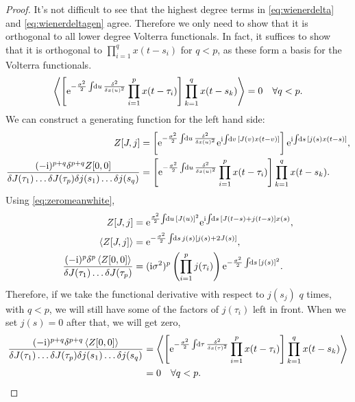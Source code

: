 \documentclass[12pt]{article}
\theoremstyle{slplain}
\theoremstyle{sldefinition}
\theoremstyle{remark}
\begin{document}
\begin{proof}
  It's not difficult to see that the highest degree terms in \eqref{eq:wienerdelta} and \eqref{eq:wienerdeltagen} agree. Therefore we only need to show that it is orthogonal to all lower degree Volterra functionals. In fact, it suffices to show that it is orthogonal to $\prod_{i=1}^q x(t-s_i)$ for $q<p$, as these form a basis for the Volterra functionals.
  \begin{equation}\label{eq:wienerdeltavol}
    \av{\brk{\e^{-\frac{\sigma^2}{2}\intd{u}\fdf{^2}{x(u)^2}} \prod_{i=1}^p x(t-\tau_i)}\prod_{k=1}^q x(t-s_k)} = 0 \quad \forall q<p.
  \end{equation}
  We can construct a generating function for the left hand side:
  \begin{equation}\label{eq:wienerdeltavolgen}
    \begin{aligned}
      Z[J,j] &= \brk{\e^{-\frac{\sigma^2}{2}\intd{u}\fdf{^2}{x(u)^2}} \e^{\ir\!\intd{v} [J(v) x(t-v)]}} \e^{\ir\!\intd{s} [j(s) x(t-s)]},\\
      \frac{(-\ir)^{p+q}\delta^{p+q}Z[0,0]}{\delta J(\tau_1)\ldots\delta J(\tau_p) \delta j(s_1)\ldots\delta j(s_q)}  &= \brk{\e^{-\frac{\sigma^2}{2}\intd{u}\fdf{^2}{x(u)^2}} \prod_{i=1}^p x(t-\tau_i)}\prod_{k=1}^q x(t-s_k).
    \end{aligned}
  \end{equation}
  Using \eqref{eq:zeromeanwhite},
  \begin{equation*}
    \begin{aligned}
      Z[J,j] &= \e^{\frac{\sigma^2}{2}\!\intd{u} [J(u)]^2} \e^{\ir\!\intd{s} [J(t-s)+j(t-s)] x(s)}, \\
       \av{Z[J,j]} &= \e^{-\frac{\sigma^2}{2}\intd{s} j(s)[j(s)+2J(s)]},\\
       \frac{(-\ir)^{p}\delta^{p}\av{Z[0,0]}}{\delta J(\tau_1)\ldots\delta J(\tau_p)}  &= (\ir\sigma^2)^p \prn{\prod_{i=1}^p j(\tau_i)}\e^{-\frac{\sigma^2}{2}\intd{s} [j(s)]^2}.
    \end{aligned}
  \end{equation*}
  Therefore, if we take the functional derivative with respect to $j(s_j)$ $q$ times, with $q<p$, we will still have some of the factors of $j(\tau_i)$ left in front. When we set $j(s)=0$ after that, we will get zero, \ie
  \begin{equation*}
  \begin{aligned}
    \frac{(-\ir)^{p+q}\delta^{p+q}\av{Z[0,0]}}{\delta J(\tau_1)\ldots\delta J(\tau_p) \delta j(s_1)\ldots\delta j(s_q)}  &= \av{\brk{\e^{-\frac{\sigma^2}{2}\intd{\tau}\fdf{^2}{x(\tau)^2}} \prod_{i=1}^p x(t-\tau_i)}\prod_{k=1}^q x(t-s_k)}\\ &= 0 \quad \forall q<p.
  \end{aligned}
  \end{equation*}
\end{proof}
\end{document}
